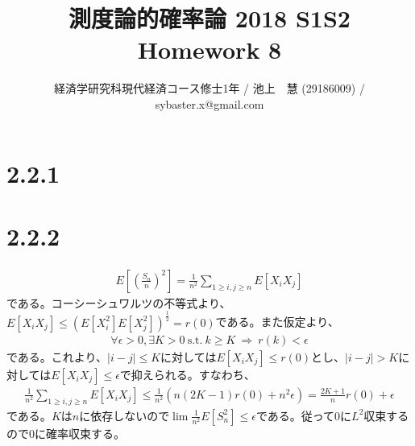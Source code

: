 \documentclass{article}
\begin{document}
\title{測度論的確率論 2018 S1S2 \\ 
Homework 8}
\author{経済学研究科現代経済コース修士1年 / 池上　慧 (29186009) / sybaster.x@gmail.com}
\maketitle

\section{2.2.1}

\section{2.2.2}
\begin{align*}
	E\left[ \left(\frac{S_n}{n}\right)^2 \right] = \frac{1}{n^2} \sum_{1\geq i,j\geq n} E\left[ X_i X_j \right]
\end{align*}
である。コーシーシュワルツの不等式より、$E\left[ X_i X_j \right] \leq \left( E\left[ X_i^2 \right] E\left[ X_j^2 \right] \right)^{\frac{1}{2}} = r(0)$である。また仮定より、
\begin{align*}
	\forall \epsilon > 0, \exists K > 0\ \text{s.t.}\ k \geq K\ \Rightarrow\ r(k) < \epsilon
\end{align*}
である。これより、$|i-j| \leq K$に対しては$E[X_i X_j] \leq r(0)$とし、$|i-j| > K$に対しては$E[X_i X_j] \leq \epsilon$で抑えられる。すなわち、
\begin{align*}
	\frac{1}{n^2} \sum_{1\geq i,j\geq n} E\left[ X_i X_j \right] \leq \frac{1}{n^2} \left( n(2K-1)r(0) + n^2\epsilon \right) = \frac{2K+1}{n}r(0) + \epsilon
\end{align*}
である。$K$は$n$に依存しないので$\lim \frac{1}{n^2} E[S_n^2] \leq \epsilon$である。従って$0$に$L^2$収束するので$0$に確率収束する。
\end{document}

